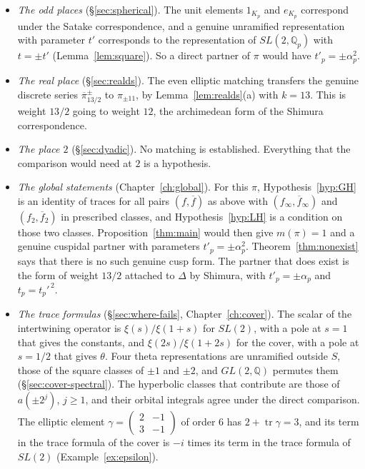 \documentclass[12pt,letterpaper,openany]{book}
\theoremstyle{plain}
\theoremstyle{definition}
\theoremstyle{remark}
\theoremstyle{remark}
\newcommand{\tr}{\operatorname{tr}}
\begin{document}
\begin{itemize}
\item \emph{The odd places} (\S\ref{sec:spherical}). The unit elements
$1_{K_p}$ and $e_{K_p}$ correspond under the Satake correspondence, and
a genuine unramified representation with parameter $t'$ corresponds to
the representation of $SL(2,{\mathbb Q}_p)$ with $t=\pm t'$
(Lemma~\ref{lem:square}). So a direct partner of $\pi$ would have
$t'_p=\pm\alpha_p^2$.

\item \emph{The real place} (\S\ref{sec:realds}). The even elliptic
matching transfers the genuine discrete series
$\overline\pi{}^{\pm}_{13/2}$ to $\pi_{\pm11}$, by
Lemma~\ref{lem:realds}(a) with $k=13$. This is weight $13/2$ going to
weight $12$, the archimedean form of the Shimura correspondence.

\item \emph{The place $2$} (\S\ref{sec:dyadic}). No matching is
established. Everything that the comparison would need at $2$ is a
hypothesis.

\item \emph{The global statements} (Chapter~\ref{ch:global}). For this
$\pi$, Hypothesis~\ref{hyp:GH} is an identity of traces for all pairs
$(f,\overline f)$ as above with $(f_\infty,\overline f_\infty)$ and
$(f_2,\overline f_2)$ in prescribed classes, and Hypothesis~\ref{hyp:LH}
is a condition on those two classes. Proposition~\ref{thm:main} would
then give $m(\pi)=1$ and a genuine cuspidal partner with parameters
$t'_p=\pm\alpha_p^2$. Theorem~\ref{thm:nonexist} says that there is no
such genuine cusp form. The partner that does exist is the form of
weight $13/2$ attached to $\Delta$ by Shimura, with $t'_p=\pm\alpha_p$
and $t_p=t_p'^{\,2}$.

\item \emph{The trace formulas} (\S\ref{sec:where-fails},
Chapter~\ref{ch:cover}). The scalar of the intertwining operator is
$\xi(s)/\xi(1+s)$ for $SL(2)$, with a pole at $s=1$ that gives the
constants, and $\xi(2s)/\xi(1+2s)$ for the cover, with a pole at
$s=1/2$ that gives $\theta$. Four theta representations are unramified
outside $S$, those of the square classes of $\pm1$ and $\pm2$, and
$GL(2,{\mathbb Q})$ permutes them (\S\ref{sec:cover-spectral}). The
hyperbolic classes that contribute are those of $a(\pm2^j)$, $j\geq1$,
and their orbital integrals agree under the direct comparison. The
elliptic element
$\gamma=\left(\begin{smallmatrix}2&-1\\3&-1\end{smallmatrix}\right)$ of
order $6$ has $2+\tr\gamma=3$, and its term in the trace formula of the
cover is $-i$ times its term in the trace formula of $SL(2)$
(Example~\ref{ex:epsilon}).
\end{itemize}
\end{document}
